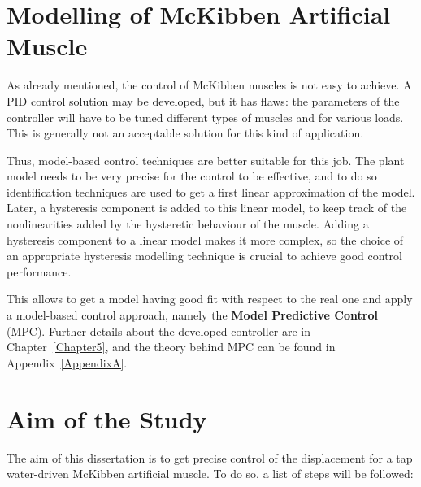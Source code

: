 \section{Modelling of McKibben Artificial Muscle}

As already mentioned, the control of McKibben muscles is not easy to achieve.
A PID control solution may be developed, but it has flaws:
the parameters of the controller will have to be tuned different types of muscles
and for various loads. 
This is generally not an acceptable solution for this kind of application.

Thus, model-based control techniques are better suitable for this job. The plant model
needs to be very precise for the control to be effective, and to do so identification techniques are used to get a first linear approximation of the model.
Later, a hysteresis component is added to this linear model, to keep track of the
nonlinearities added by the hysteretic behaviour of the muscle.
Adding a hysteresis component to a linear model makes it more complex, 
so the choice of an appropriate hysteresis modelling technique is crucial to achieve
good control performance.

This allows to get a model having good fit with respect to the real one
and apply a model-based control approach, namely the \textbf{Model Predictive Control} (MPC).
Further details about the developed controller are in Chapter~\ref{Chapter5},
and the theory behind MPC can be found in Appendix~\ref{AppendixA}.

\section{Aim of the Study}

The aim of this dissertation is to get precise control of the displacement for
a tap water-driven McKibben artificial muscle. To do so, a list of steps will be followed:

